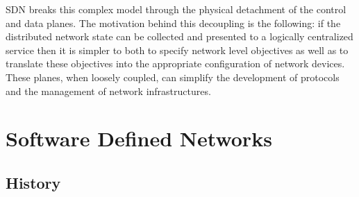 SDN breaks this complex model through the physical detachment of the control and data planes.  
The motivation behind this decoupling is the following: if the distributed network state can be collected and presented to a logically centralized service then it is simpler to both to specify network level objectives as well as to translate these objectives into the appropriate configuration of network devices. 
These planes, when loosely coupled, can simplify the development of protocols and the management of network infrastructures. 


\section{Software Defined Networks}
\glsresetall
\label{sec:background:sdn}


\subsection{History}

